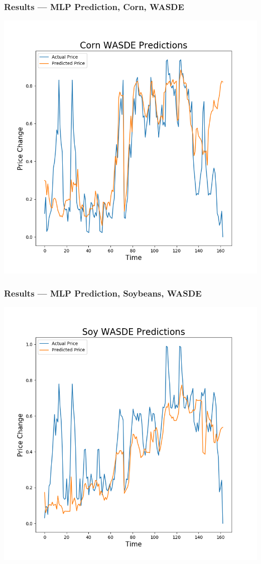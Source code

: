 \documentclass{beamer}
\begin{document}
\begin{frame}
\frametitle{Results --- MLP Prediction, Corn, WASDE}
\begin{center}
\includegraphics[scale=.4]{images/CornWASDE}
\end{center}
\end{frame}

\begin{frame}
\frametitle{Results --- MLP Prediction, Soybeans, WASDE}
\begin{center}
\includegraphics[scale=.4]{images/SoyWASDE}
\end{center}
\end{frame}
\end{document}
